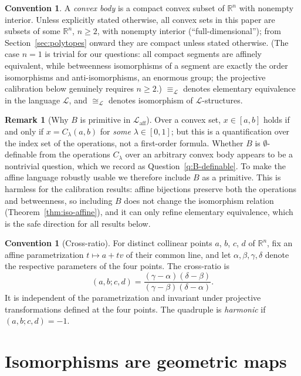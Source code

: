 \documentclass[11pt]{amsart}
\theoremstyle{definition}
\newtheorem{remark}[theorem]{Remark}
\newtheorem{convention}[theorem]{Convention}
\newcommand{\R}{\mathbb{R}}
\newcommand{\Laff}{\mathcal{L}_{\mathrm{aff}}}
\begin{document}
\begin{convention}\label{conv:body}
A \emph{convex body} is a compact convex subset of $\R^n$ with nonempty
interior. Unless explicitly stated otherwise, all convex sets in this paper
are subsets of some $\R^n$, $n\ge2$, with nonempty interior
(``full-dimensional''); from Section~\ref{sec:polytopes} onward they are
compact unless stated otherwise. (The case $n=1$ is trivial for our questions: all
compact segments are affinely equivalent, while betweenness isomorphisms of a
segment are exactly the order isomorphisms and anti-isomorphisms, an
enormous group; the projective calibration below genuinely requires
$n\ge2$.) $\equiv_{\mathcal L}$ denotes elementary equivalence in the
language $\mathcal L$, and $\cong_{\mathcal L}$ denotes isomorphism of
$\mathcal L$-structures.
\end{convention}

\begin{remark}[Why $B$ is primitive in $\Laff$]\label{rem:B-primitive}
Over a convex set, $x\in[a,b]$ holds if and only if $x=C_\lambda(a,b)$ for
\emph{some} $\lambda\in[0,1]$; but this is a quantification over the index
set of the operations, not a first-order formula. Whether $B$ is
$\emptyset$-definable from the operations $C_\lambda$ over an arbitrary
convex body appears to be a nontrivial question, which we record as
Question~\ref{q:B-definable}. To make the affine language robustly usable we
therefore include $B$ as a primitive. This is harmless for the calibration
results: affine bijections preserve both the operations and betweenness, so
including $B$ does not change the isomorphism relation
(Theorem~\ref{thm:iso-affine}), and it can only refine elementary
equivalence, which is the safe direction for all results below.
\end{remark}

\begin{convention}[Cross-ratio]\label{conv:crossratio}
For distinct collinear points $a$, $b$, $c$, $d$ of $\R^n$, fix an affine
parametrization $t\mapsto a+t v$ of their common line, and let
$\alpha,\beta,\gamma,\delta$ denote the respective parameters of the four
points. The cross-ratio is
\[
(a,b;c,d)
=\frac{(\gamma-\alpha)(\delta-\beta)}{(\gamma-\beta)(\delta-\alpha)} .
\]
It is independent of the parametrization and invariant under projective
transformations defined at the four points. The quadruple is \emph{harmonic}
if $(a,b;c,d)=-1$.
\end{convention}

\section{Isomorphisms are geometric maps}\label{sec:iso}
\end{document}
